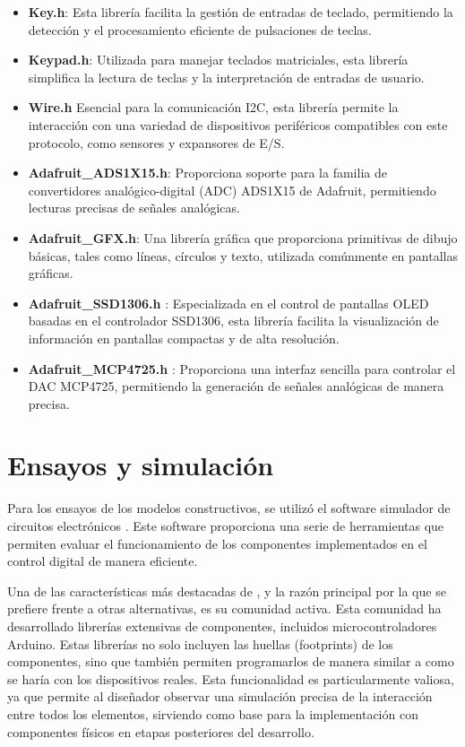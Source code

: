 \begin{itemize}
    \item \textbf{Key.h}\cite{Keypad}: Esta librería facilita la gestión de entradas de teclado, permitiendo la detección y el procesamiento eficiente de pulsaciones de teclas.
    \item \textbf{Keypad.h}\cite{Keypad}: Utilizada para manejar teclados matriciales, esta librería simplifica la lectura de teclas y la interpretación de entradas de usuario.
    \item \textbf{Wire.h}\cite{WireLibrary} Esencial para la comunicación I2C, esta librería permite la interacción con una variedad de dispositivos periféricos compatibles con este protocolo, como sensores y expansores de E/S.
    \item \textbf{Adafruit\_ADS1X15.h}\cite{ADS1115Library}: Proporciona soporte para la familia de convertidores analógico-digital (ADC) ADS1X15 de Adafruit, permitiendo lecturas precisas de señales analógicas.
    \item \textbf{Adafruit\_GFX.h}\cite{GFXLibrary}: Una librería gráfica que proporciona primitivas de dibujo básicas, tales como líneas, círculos y texto, utilizada comúnmente en pantallas gráficas.
    \item \textbf{Adafruit\_SSD1306.h}\cite{SSD1306Library} : Especializada en el control de pantallas OLED basadas en el controlador SSD1306, esta librería facilita la visualización de información en pantallas compactas y de alta resolución.
    \item \textbf{Adafruit\_MCP4725.h}\cite{MCP4725Library} : Proporciona una interfaz sencilla para controlar el DAC MCP4725, permitiendo la generación de señales analógicas de manera precisa.
\end{itemize}

\section{Ensayos y simulación}
Para los ensayos de los modelos constructivos, se utilizó el software simulador de circuitos electrónicos . Este software proporciona una serie de herramientas que permiten evaluar el funcionamiento de los componentes implementados en el control digital de manera eficiente. \par 
Una de las características más destacadas de , y la razón principal por la que se prefiere frente a otras alternativas, es su comunidad activa. Esta comunidad ha desarrollado librerías extensivas de componentes, incluidos microcontroladores Arduino. Estas librerías no solo incluyen las huellas (footprints) de los componentes, sino que también permiten programarlos de manera similar a como se haría con los dispositivos reales. Esta funcionalidad es particularmente valiosa, ya que permite al diseñador observar una simulación precisa de la interacción entre todos los elementos, sirviendo como base para la implementación con componentes físicos en etapas posteriores del desarrollo.

